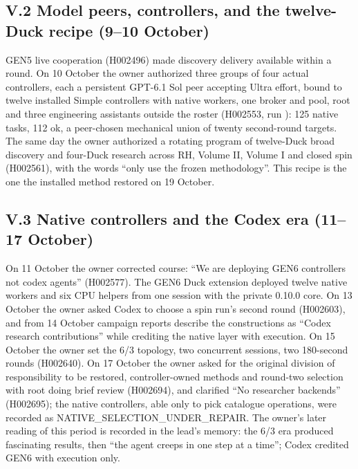 \subsection{V.2 Model peers, controllers, and the twelve-Duck recipe (9--10 October)}\label{v.2-model-peers-controllers-and-the-twelve-duck-recipe-910-october}

GEN5 live cooperation (H002496) made discovery delivery available within a round. On 10 October the owner authorized three groups of four
actual controllers, each a persistent GPT-6.1 Sol peer accepting Ultra effort, bound to twelve installed Simple controllers with native
workers, one broker and pool, root and three engineering assistants outside the roster (H002553, run ): 125 native
tasks, 112 ok, a peer-chosen mechanical union of twenty second-round targets. The same day the owner authorized a rotating program of
twelve-Duck broad discovery and four-Duck research across RH, Volume II, Volume I and closed spin (H002561), with the words ``only use the
frozen methodology''. This recipe is the one the installed method restored on 19 October.

\subsection{V.3 Native controllers and the Codex era (11--17 October)}\label{v.3-native-controllers-and-the-codex-era-1117-october}

On 11 October the owner corrected course: ``We are deploying GEN6 controllers not codex agents'' (H002577). The GEN6 Duck extension deployed
twelve native workers and six CPU helpers from one session with the private 0.10.0 core. On 13 October the owner asked Codex to choose a
spin run's second round (H002603), and from 14 October campaign reports describe the constructions as ``Codex research contributions'' while
crediting the native layer with execution. On 15 October the owner set the 6/3 topology, two concurrent sessions, two 180-second rounds
(H002640). On 17 October the owner asked for the original division of responsibility to be restored, controller-owned methods and round-two
selection with root doing brief review (H002694), and clarified ``No researcher backends'' (H002695); the native controllers, able only to pick
catalogue operations, were recorded as NATIVE\_SELECTION\_UNDER\_REPAIR. The owner's later reading of this period is recorded in the lead's
memory: the 6/3 era produced fascinating results, then ``the agent creeps in one step at a time''; Codex credited GEN6 with execution only.

